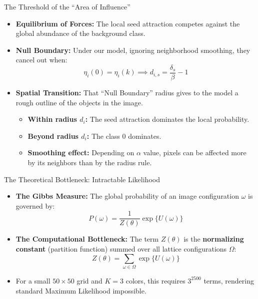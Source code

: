 \documentclass[
  ignorenonframetext,
]{beamer}
\providecommand{\tightlist}{%
  \setlength{\itemsep}{0pt}\setlength{\parskip}{0pt}}\usepackage{longtable,booktabs,array}
\begin{document}
\begin{frame}{The Threshold of the ``Area of Influence''}
\label{the-threshold-of-the-area-of-influence}
\begin{itemize}
\tightlist
\item
  \textbf{Equilibrium of Forces:} The local seed attraction competes
  against the global abundance of the background class.
\item
  \textbf{Null Boundary:} Under our model, ignoring neighborhood
  smoothing, they cancel out when:
  \[\eta_i(0)= \eta_i(k) \implies d_{i,s} = \frac{\delta_s}{\beta}-1\]
\item
  \textbf{Spatial Transition:} That ``Null Boundary'' radius gives to
  the model a rough outline of the objects in the image.

  \begin{itemize}
  \tightlist
  \item
    \textbf{Within radius \(d_i\):} The seed attraction dominates the
    local probability.
  \item
    \textbf{Beyond radius \(d_i\):} The class 0 dominates.
  \item
    \textbf{Smoothing effect:} Depending on \(\alpha\) value, pixels can
    be affected more by its neighbors than by the radius rule.
  \end{itemize}
\end{itemize}
\end{frame}

\begin{frame}{The Theoretical Bottleneck: Intractable Likelihood}
\label{the-theoretical-bottleneck-intractable-likelihood}
\begin{itemize}
\tightlist
\item
  \textbf{The Gibbs Measure:} The global probability of an image
  configuration \(\omega\) is governed by:
  \[P(\omega) = \frac{1}{Z(\theta)} \exp\{U(\omega)\}\]
\item
  \textbf{The Computational Bottleneck:} The term \(Z(\theta)\) is the
  \textbf{normalizing constant} (partition function) summed over all
  lattice configurations \(\Omega\):
  \[Z(\theta) = \sum_{\omega \in \Omega} \exp\{U(\omega)\}\]
\item
  For a small \(50 \times 50\) grid and \(K = 3\) colors, this requires
  \(3^{2500}\) terms, rendering standard Maximum Likelihood impossible.
\end{itemize}
\end{frame}
\end{document}
